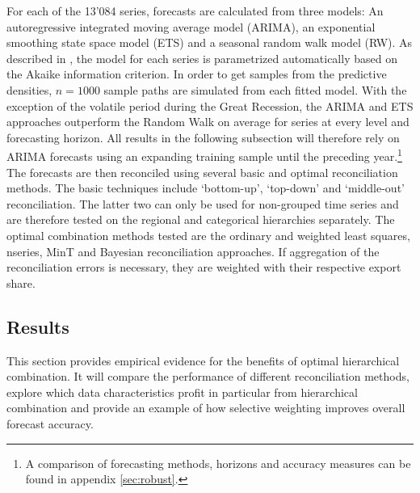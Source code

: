 \documentclass[a4paper,fleqn,11pt]{article}
\begin{document}
For each of the 13'084 series, forecasts are calculated from three models: An autoregressive integrated moving average model (ARIMA), an exponential smoothing state space model (ETS) and a seasonal random walk model (RW). As described in \cite{Hyndman2008}, the model for each series is parametrized automatically based on the Akaike information criterion. In order to get samples from the predictive densities, $n = 1000$ sample paths are simulated from each fitted model. With the exception of the volatile period during the Great Recession, the ARIMA and ETS approaches outperform the Random Walk on average for series at every level and forecasting horizon. All results in the following subsection will therefore rely on ARIMA forecasts using an expanding training sample until the preceding year.\footnote{A comparison of forecasting methods, horizons and accuracy measures can be found in appendix \ref{sec:robust}.}\\

The forecasts are then reconciled using several basic and optimal reconciliation methods. The basic techniques include `bottom-up', `top-down' and `middle-out' reconciliation. The latter two can only be used for non-grouped time series and are therefore tested on the regional and categorical hierarchies separately. The optimal combination methods tested are the ordinary and weighted least squares, nseries, MinT and Bayesian reconciliation approaches. If aggregation of the reconciliation errors is necessary, they are weighted with their respective export share.\\


\subsection{Results}
This section provides empirical evidence for the benefits of optimal hierarchical combination. It will compare the performance of different reconciliation methods, explore which data characteristics profit in particular from hierarchical combination and provide an example of how selective weighting improves overall forecast accuracy.\\
 
\end{document}
